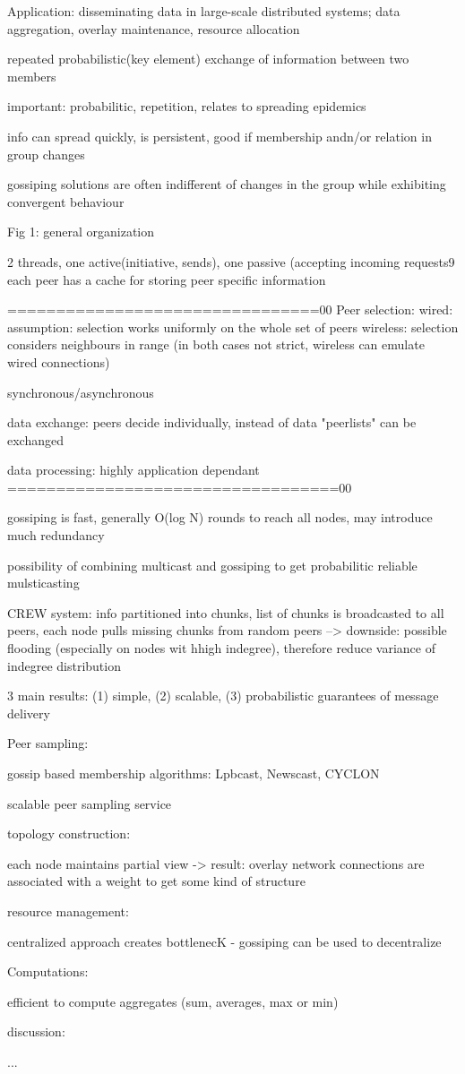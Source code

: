 Application: disseminating data in large-scale distributed systems; data aggregation, overlay maintenance, resource allocation

repeated probabilistic(key element)  exchange of information between two members 

important: probabilitic, repetition, relates to spreading epidemics

info can spread quickly, is persistent, good if membership andn/or relation in group changes

gossiping solutions are often indifferent of changes in the group while exhibiting convergent behaviour

Fig 1: general organization

2 threads, one active(initiative, sends), one passive (accepting incoming requests9
each peer has a cache for storing peer specific information


================================00
Peer selection: wired: assumption: selection works uniformly on the whole set of peers
wireless: selection considers neighbours in range
(in both cases not strict, wireless can emulate wired connections)

synchronous/asynchronous

data exchange: peers decide individually, instead of data "peerlists" can be exchanged

data processing: highly application dependant
==================================00

gossiping is fast, generally O(log N) rounds to reach all nodes, may introduce much redundancy

possibility of combining multicast and gossiping to get probabilitic reliable mulsticasting

CREW system: info partitioned into chunks, list of chunks is broadcasted to all peers, each node pulls missing chunks from random peers
--> downside: possible flooding (especially on nodes wit hhigh indegree), therefore reduce variance of indegree distribution

3 main results: (1) simple, (2) scalable, (3) probabilistic guarantees of message delivery

Peer sampling:

gossip based membership algorithms: Lpbcast, Newscast, CYCLON

scalable peer sampling service


topology construction:

each node maintains partial view -> result: overlay network
connections are associated with a weight to get some kind of structure

resource management:

centralized approach creates bottlenecK - gossiping can be used to decentralize 

Computations:

efficient to compute aggregates (sum, averages, max or min)

discussion:

...
